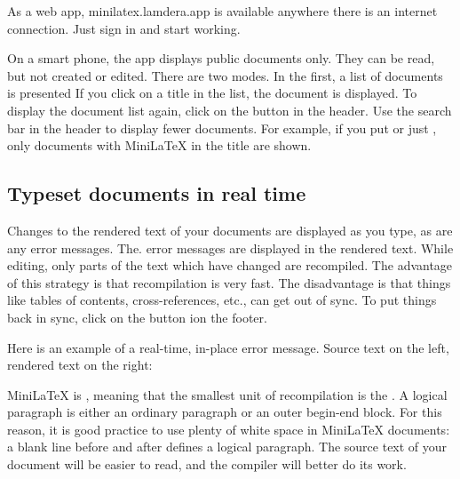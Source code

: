 As a web app, minilatex.lamdera.app is available anywhere there is an internet connection.  Just sign in and start working.





On a smart phone, the app displays public documents only.  They can be read, but not created or edited.  There are two modes.  In the first, a list of documents is presented If you click on a title in the list, the document is displayed. To display the document list again, click on the  button in the header. Use the search bar in the header to display fewer documents.  For example, if you put  or just , only documents with MiniLaTeX in the title are shown.


\subsection{Typeset documents in real time}

Changes to the rendered text of your documents are displayed as you type, as are any error messages.  The. error messages are displayed in the rendered text.  While editing, only parts of the text which have changed are recompiled.  The advantage of this strategy  is that recompilation is very fast.  The disadvantage is that things like tables of contents, cross-references, etc., can get out of sync.  To put things back in sync, click on the  button ion the footer.

Here is an example of a real-time, in-place error message.  Source text on the left, rendered text on the right:


 MiniLaTeX is , meaning that the smallest unit of recompilation is the .  A logical paragraph is either an ordinary paragraph or an outer begin-end block.  For this reason, it is good practice to use plenty of white space in MiniLaTeX documents: a blank line before and after defines a logical paragraph.  The source text of your document will be easier to read, and the compiler will better do its work.

